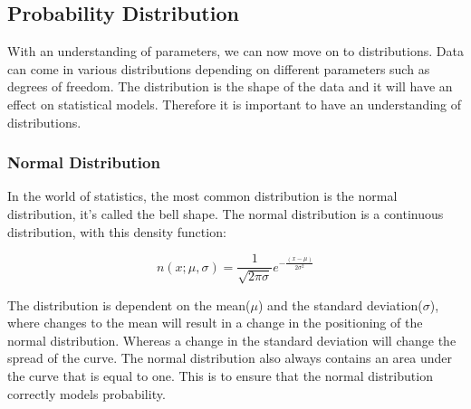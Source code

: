 \subsection{Probability Distribution}
With an understanding of parameters, we can now move on to distributions. Data can come in various distributions depending on different parameters such
as degrees of freedom. The distribution is the shape of the data and it will have
an effect on statistical models. Therefore it is important to have an understanding of distributions.
\subsubsection{Normal Distribution}

In the world of statistics, the most common distribution is the normal distribution, it's called the bell shape. The normal distribution is a continuous distribution, with this density function:

\begin{equation}
n(x;\mu,\sigma) =\frac{1}{\sqrt{2\pi\sigma}}e^{-\frac{(x-\mu)}{2\sigma^2}}
\end{equation}

\noindent The distribution is dependent on the mean($\mu$) and the standard deviation($\sigma$), where changes to the mean will result in a change in the positioning of the normal distribution. Whereas a change in the standard deviation will change the spread of the curve. The normal distribution also always contains an area under the curve that is equal to one. This is to ensure that the normal distribution correctly models probability.

